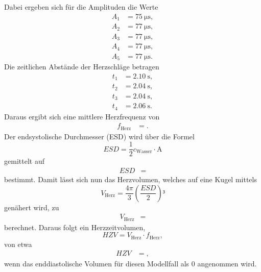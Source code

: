 Dabei ergeben sich für die Amplituden die Werte
\begin{align*}
  A_1 &= \SI{75}{\micro\second},\\
  A_2 &= \SI{77}{\micro\second},\\
  A_3 &= \SI{77}{\micro\second},\\
  A_4 &= \SI{77}{\micro\second},\\
  A_5 &= \SI{77}{\micro\second}.
\end{align*}
Die zeitlichen Abstände der Herzschläge betragen
\begin{align*}
  t_1 &= \SI{2,10}{\second},\\
  t_2 &= \SI{2,04}{\second},\\
  t_3 &= \SI{2,04}{\second},\\
  t_4 &= \SI{2,06}{\second}.
\end{align*}
Daraus ergibt sich eine mittlere Herzfrequenz von
\begin{align*}
  f_{\text{Herz}} &= .
\end{align*}
Der endsystolische Durchmesser (ESD) wird über die Formel
\begin{equation}
  ESD = \frac{1}{2} c_{\text{Wasser}} \cdot \text{A}
\end{equation}
gemittelt auf
\begin{align*}
  ESD &= 
\end{align*}
bestimmt.
Damit lässt sich nun das Herzvolumen, welches auf eine Kugel mittels
\begin{equation}
  V_{\text{Herz}} = \frac{4\pi}{3} \left(\frac{ESD}{2} \right)³
\end{equation}
genähert wird, zu
\begin{align*}
  V_{\text{Herz}} &= 
\end{align*}
berechnet.
Daraus folgt ein Herzzeitvolumen,
\begin{equation}
  HZV = V_{\text{Herz}} \cdot f_{\text{Herz}},
\end{equation}
von etwa
\begin{align*}
  HZV &= ,
\end{align*}
wenn das enddiastolische Volumen für diesen Modellfall als $0$ angenommen wird.

